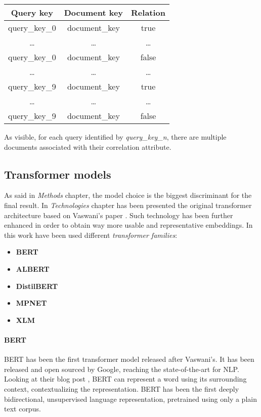 \documentclass[\main/main.tex]{subfiles}
\begin{document}
\begin{center}
    \begin{tabular}{||c | c c||} 
     \hline
     Query key & Document key & Relation\\ [0.5ex] 
     \hline\hline
     query\_key\_0 & document\_key & true \\ 
     \hline
     \dots & \dots & \dots\\
     \hline
     query\_key\_0 & document\_key & false\\
     \hline
     \dots & \dots & \dots\\
     \hline
     query\_key\_9 & document\_key & true \\ 
     \hline
     \dots & \dots & \dots\\
     \hline
     query\_key\_9 & document\_key & false\\
     \hline
    \end{tabular}
\end{center}
As visible, for each query identified by \textit{query\_key\_n}, there are multiple documents associated with their correlation attribute.
\subsection{Transformer models}
As said in \textit{Methods} chapter, the model choice is the biggest discriminant for the final result. In \textit{Technologies} chapter has been presented the original transformer architecture based on Vaswani's paper \cite{vaswani2017attention}. Such technology has been further enhanced in order to obtain way more usable and representative embeddings. In this work have been used different \textit{transformer families}:
\begin{itemize}
    \item \textbf{BERT}
    \item \textbf{ALBERT}
    \item \textbf{DistilBERT}
    \item \textbf{MPNET}
    \item \textbf{XLM}
\end{itemize}
\paragraph{BERT}
BERT has been the first transformer model released after Vaswani's. It has been released and open sourced by Google, reaching the state-of-the-art for NLP. Looking at their blog post \cite{bert_blog_post}, BERT can represent a word using its surrounding context, contextualizing the representation. BERT has been the first deeply bidirectional, unsupervised language representation, pretrained using only a plain text corpus. \cite{DBLP:journals/corr/abs-1810-04805}
\end{document}
